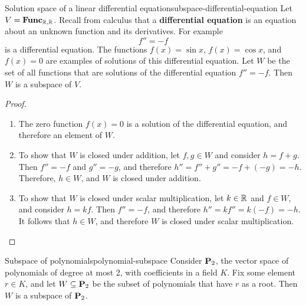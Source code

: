 \begin{example}{Solution space of a linear differential equation}{subspace-differential-equation}
  Let $V=\mathbf{Func}_{\mathbb{R},\mathbb{R}}$. Recall from calculus that a
  \textbf{differential equation}%
   is an equation about an unknown
  function and its derivatives. For example
  \begin{equation*}
    f'' = -f
  \end{equation*}
  is a differential equation. The functions $f(x)=\sin x$,
  $f(x)=\cos x$, and $f(x)=0$ are examples of solutions of this
  differential equation.  Let $W$ be the set of all functions that are
  solutions of the differential equation $f'' = -f$. Then $W$ is a
  subspace of\/ $V$.
\end{example}

\begin{proof}
  \begin{enumerate}
  \item The zero function $f(x)=0$ is a solution of the differential
    equation, and therefore an element of\/ $W$.
  \item To show that $W$ is closed under addition, let $f,g\in W$ and
    consider $h=f+g$. Then $f''=-f$ and $g''=-g$, and therefore
    $h'' = f'' + g'' = -f+(-g) = -h$. Therefore, $h\in W$, and $W$ is
    closed under addition.
  \item To show that $W$ is closed under scalar multiplication, let
    $k\in\mathbb{R}$ and $f\in W$, and consider $h=kf$. Then $f''=-f$, and
    therefore $h'' = kf'' = k(-f) = -h$. It follows that $h\in W$, and
    therefore $W$ is closed under scalar multiplication.
  \end{enumerate}
\end{proof}

\begin{example}{Subspace of polynomials}{polynomial-subspace}
  Consider $\mathbf{P}_2$, the vector space of polynomials of degree at
  most 2, with coefficients in a field $K$. Fix some element $r\in K$,
  and let $W \subseteq \mathbf{P}_2$ be the subset of polynomials that have
  $r$ as a root. Then $W$ is a subspace of $\mathbf{P}_2$.
\end{example}

